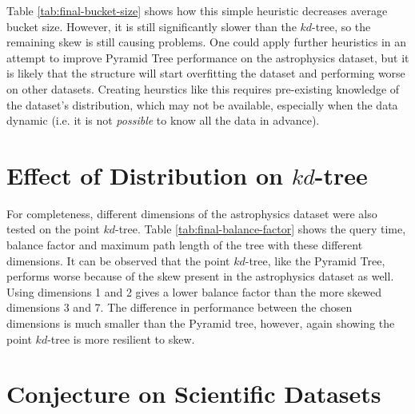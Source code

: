Table \ref{tab:final-bucket-size} shows how this simple heuristic decreases average bucket size. However, it is still significantly slower than the $kd$-tree, so the remaining skew is still causing problems. One could apply further heuristics in an attempt to improve Pyramid Tree performance on the astrophysics dataset, but it is likely that the structure will start overfitting the dataset and performing worse on other datasets. Creating heurstics like this requires pre-existing knowledge of the dataset's distribution, which may not be available, especially when the data dynamic (i.e. it is not \textit{possible} to know all the data in advance).

\section{Effect of Distribution on $kd$-tree}

For completeness, different dimensions of the astrophysics dataset were also tested on the point $kd$-tree. Table \ref{tab:final-balance-factor} shows the query time, balance factor and maximum path length of the tree with these different dimensions. It can be observed that the point $kd$-tree, like the Pyramid Tree, performs worse because of the skew present in the astrophysics dataset as well. Using dimensions 1 and 2 gives a lower balance factor than the more skewed dimensions 3 and 7. The difference in performance between the chosen dimensions is much smaller than the Pyramid tree, however, again showing the point $kd$-tree is more resilient to skew.

\begin{table}
	\centering
	\caption{Point $kd$-tree Statistics with Different Dimensions of Astrophysics Dataset}
	\label{tab:final-balance-factor}
\end{table}

\section{Conjecture on Scientific Datasets}

